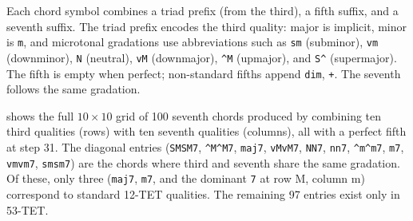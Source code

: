 \documentclass{aimc2026}
\begin{document}
Each chord symbol combines a triad prefix (from the third), a fifth suffix, and a seventh suffix. The triad prefix encodes the third quality: major is implicit, minor is \texttt{m}, and microtonal gradations use abbreviations such as \texttt{sm} (subminor), \texttt{vm} (downminor), \texttt{N} (neutral), \texttt{vM} (downmajor), \texttt{\^{}M} (upmajor), and \texttt{S\^{}} (supermajor). The fifth is empty when perfect; non-standard fifths append \texttt{dim}, \texttt{+}. The seventh follows the same gradation.

 shows the full $10 \times 10$ grid of 100 seventh chords produced by combining ten third qualities (rows) with ten seventh qualities (columns), all with a perfect fifth at step 31. The diagonal entries (\texttt{SMSM7}, \texttt{\^{}M\^{}M7}, \texttt{maj7}, \texttt{vMvM7}, \texttt{NN7}, \texttt{nn7}, \texttt{\^{}m\^{}m7}, \texttt{m7}, \texttt{vmvm7}, \texttt{smsm7}) are the chords where third and seventh share the same gradation. Of these, only three (\texttt{maj7}, \texttt{m7}, and the dominant \texttt{7} at row M, column m) correspond to standard 12-TET qualities. The remaining 97 entries exist only in 53-TET.
\end{document}
